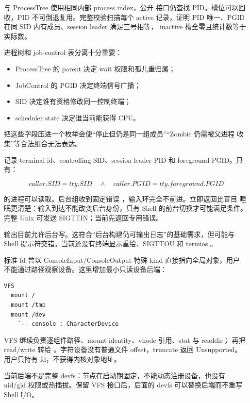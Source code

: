  与 ProcessTree 使用相同内部 process index，公开
接口仍查找 PID。槽位可以回收，PID 不可倒退复用。完整校验扫描每个 active
记录，证明 PID 唯一、PGID 在同 SID 内有成员、session leader 满足三号相等，
inactive 槽全零且统计数等于实际数。

进程树和 job-control 表分离十分重要：

\begin{itemize}
  \item ProcessTree 的 parent 决定 wait 权限和孤儿重归属；
  \item JobControl 的 PGID 决定终端信号广播；
  \item SID 决定谁有资格修改同一控制终端；
  \item scheduler state 决定谁当前能获得 CPU。
\end{itemize}

把这些字段压进一个枚举会使“停止但仍是同一组成员”“Zombie 仍需被父进程
收集”等合法组合无法表达。

 记录 terminal id、controlling SID、session leader PID 和
foreground PGID。只有：

\[
caller.SID=tty.SID\quad\land\quad caller.PGID=tty.foreground.PGID
\]

的进程可以读取。后台组收到固定错误
，输入环完全不前进。立即返回比盲目
睡眠更清楚：输入到达不能改变后台身份，只有 Shell 的前台切换才可能满足条件。
完整 Unix 可发送 SIGTTIN；当前先返回专用错误。

输出目前允许后台写。这符合“后台构建仍可输出日志”的基础需求，但可能与 Shell
提示符交错。当前还没有终端显示重绘、SIGTTOU 和 termios 。

标准 fd 曾以 ConsoleInput/ConsoleOutput 特殊 kind 直接指向全局对象，用户
不能通过路径观察设备。这里增加最小只读设备后端：

\begin{lstlisting}
VFS
  mount /
  mount /tmp
  mount /dev
    `-- console : CharacterDevice
\end{lstlisting}

VFS 继续负责逐组件路径、mount identity、vnode 引用、stat 与 readdir；
 再把 read/write 转给
。字符设备没有普通文件 offset，truncate 返回 Unsupported。
用户只持有 fd，不获得内核对象地址。

当前后端不是完整 devfs：节点在启动期固定，不能动态注册设备，也没有 uid/gid
权限或热插拔。保留 VFS 接口后，后面的 devfs 可以替换后端而不重写 Shell I/O。


